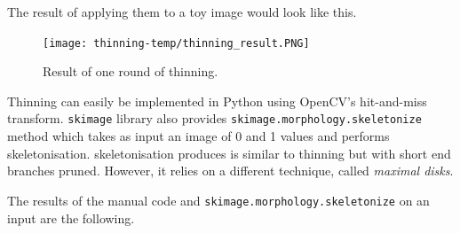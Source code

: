\documentclass[a4paper]{article}
\begin{document}
\begin{multicols}{8}
\begin{figure}[H]
    \centering
    
    \captionsetup{width=.12\linewidth}
    {\caption*{}}
\end{figure}

\columnbreak
\begin{figure}[H]
    \centering
    
    \captionsetup{width=.12\linewidth}
    {\caption*{}}
\end{figure}

\columnbreak
\begin{figure}[H]
    \centering
    
    \captionsetup{width=.12\linewidth}
    {\caption*{}}
\end{figure}

\columnbreak
\begin{figure}[H]
    \centering
    
    \captionsetup{width=.12\linewidth}
    {\caption*{}}
\end{figure}

\columnbreak
\begin{figure}[H]
    \centering
    
    \captionsetup{width=.12\linewidth}
    {\caption*{}}
\end{figure}

\columnbreak
\begin{figure}[H]
    \centering
    
    \captionsetup{width=.12\linewidth}
    {\caption*{}}
\end{figure}

\columnbreak
\begin{figure}[H]
    \centering
    
    \captionsetup{width=.12\linewidth}
    {\caption*{}}
\end{figure}

\columnbreak
\begin{figure}[H]
    \centering
    
    \captionsetup{width=.12\linewidth}
    {\caption*{}}
\end{figure}
\end{multicols}

The result of applying them to a toy image would look like this.
\begin{figure}[H]
    \centering
    \texttt{[image: thinning-temp/thinning\_result.PNG]}
    \caption{Result of one round of thinning.}
\end{figure}
Thinning can easily be implemented in Python using OpenCV's hit-and-miss transform. \texttt{skimage} library also provides \texttt{skimage.morphology.skeletonize} method which takes as input an image of 0 and 1 values and performs skeletonisation. skeletonisation produces is similar to thinning but with short end branches pruned. However, it relies on a different technique, called \textit{maximal disks}.

The results of the manual code and \texttt{skimage.morphology.skeletonize} on an input are the following.
\end{document}
